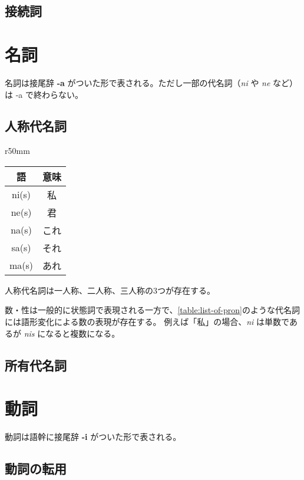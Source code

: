 
\subsection{接続詞}


\section{名詞}

名詞は接尾辞 \textbf{-a} がついた形で表される。ただし一部の代名詞（\emph{ni} や \emph{ne} など）は -a で終わらない。

\subsection{人称代名詞}

\begin{wraptable}[8]{r}{50mm}
    \centering
    \caption{主要な代名詞の一覧}
    \label{table:list-of-pron}
    \begin{tabular}{cc}
        \toprule
        語 & 意味 \\
        \midrule
        ni(s) & 私 \\
        ne(s) & 君 \\
        na(s) & これ \\
        sa(s) & それ \\
        ma(s) & あれ \\
        \bottomrule
    \end{tabular}
\end{wraptable}

人称代名詞は一人称、二人称、三人称の3つが存在する。

数・性は一般的に状態詞で表現される一方で、\cref{table:list-of-pron}のような代名詞には語形変化による数の表現が存在する。
例えば「私」の場合、\emph{ni} は単数であるが \emph{nis} になると複数になる。
\subsection{所有代名詞}

\section{動詞}

動詞は語幹に接尾辞 \textbf{-i} がついた形で表される。

\subsection{動詞の転用}

